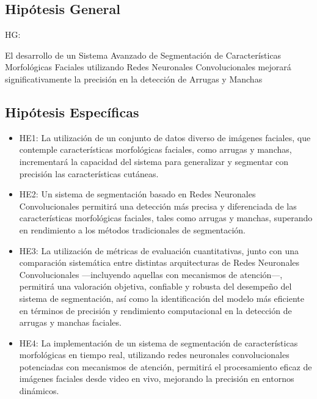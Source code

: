 \subsection{Hipótesis General}
HG: \newcommand{\HipotesisGeneral}{
	El desarrollo de un Sistema Avanzado de Segmentación de Características Morfológicas Faciales utilizando Redes Neuronales Convolucionales mejorará significativamente la precisión en la detección de Arrugas y Manchas}
\HipotesisGeneral


\subsection{Hipótesis Específicas}
\newcommand{\Hone}{
La utilización de un conjunto de datos diverso de imágenes faciales, que contemple características morfológicas faciales, como arrugas y manchas, incrementará la capacidad del sistema para generalizar y segmentar con precisión las características cutáneas.
}
\newcommand{\Htwo}{
Un sistema de segmentación basado en Redes Neuronales Convolucionales permitirá una detección más precisa y diferenciada de las características morfológicas faciales, tales como arrugas y manchas, superando en rendimiento a los métodos tradicionales de segmentación.
}
\newcommand{\Hthree}{
La utilización de métricas de evaluación cuantitativas, junto con una comparación sistemática entre distintas arquitecturas de Redes Neuronales Convolucionales —incluyendo aquellas con mecanismos de atención—, permitirá una valoración objetiva, confiable y robusta del desempeño del sistema de segmentación, así como la identificación del modelo más eficiente en términos de precisión y rendimiento computacional en la detección de arrugas y manchas faciales.
}
\newcommand{\Hfour}{
La implementación de un sistema de segmentación de características morfológicas en tiempo real, utilizando redes neuronales convolucionales potenciadas con mecanismos de atención, permitirá el procesamiento eficaz de imágenes faciales desde video en vivo, mejorando la precisión en entornos dinámicos.
}

\begin{itemize}
	\item HE1: {\Hone}
	\item HE2: {\Htwo}
	\item HE3: {\Hthree}
	\item HE4: {\Hfour}
\end{itemize}